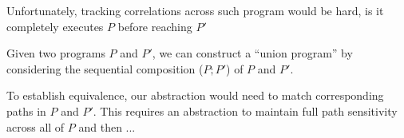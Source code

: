 Unfortunately, tracking correlations across such program would be hard, is it completely executes $P$ before reaching $P'$



Given two programs $P$ and $P'$, we can construct a ``union program'' by considering the sequential composition ($P;P'$) of $P$ and $P'$.

To establish equivalence, our abstraction would need to match corresponding paths in $P$ and $P'$. This requires an abstraction to maintain full path sensitivity across all of $P$ and then ...




